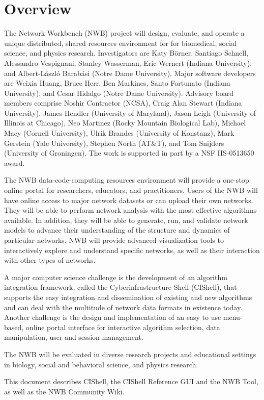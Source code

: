 
\section{Overview}

The Network Workbench (NWB) project will design, evaluate, and operate a unique 
distributed, shared resources environment for for biomedical, social science, 
and physics research. Investigators are Katy B\"{o}rner, Santiago Schnell, 
Alessandro Vespignani, Stanley Wasserman, Eric Wernert (Indiana University), 
and Albert-L\'{a}szl\'{o} Barab\'{a}si (Notre Dame University). Major software 
developers are Weixia Huang, Bruce Herr, Ben Markines, Santo Fortunato (Indiana 
University), and Cesar Hidalgo (Notre Dame University). Advisory board members 
comprise Noshir Contractor (NCSA), Craig Alan Stewart (Indiana University), 
James Hendler (University of Maryland), Jason Leigh (University of Illinois at 
Chicago), Neo Martinez (Rocky Mountain Biological Lab), Michael Macy (Cornell 
University), Ulrik Brandes (University of Konstanz), Mark Gerstein (Yale 
University), Stephen North (AT\&T), and Tom Snijders (University of Groningen). 
The work is supported in part by a NSF IIS-0513650 award.

The NWB data-code-computing resources environment will provide a one-stop 
online portal for researchers, educators, and practitioners. Users of the NWB 
will have online access to major network datasets or can upload their own 
networks. They will be able to perform network analysis with the most effective 
algorithms available. In addition, they will be able to generate, run, and 
validate network models to advance their understanding of the structure and 
dynamics of particular networks. NWB will provide advanced visualization tools 
to interactively explore and understand specific networks, as well as their 
interaction with other types of networks.

A major computer science challenge is the development of an algorithm 
integration framework, called the Cyberinfrastructure Shell (CIShell), that 
supports the easy integration and dissemination of existing and new algorithms 
and can deal with the multitude of network data formats in existence today. 
Another challenge is the design and implementation of an easy to use 
menu-based, online portal interface for interactive algorithm selection, data 
manipulation, user and session management.

The NWB will be evaluated in diverse research projects and educational settings 
in biology, social and behavioral science, and physics research.

This document describes CIShell, the CIShell Reference GUI and the NWB Tool, as 
well as the NWB Community Wiki.


